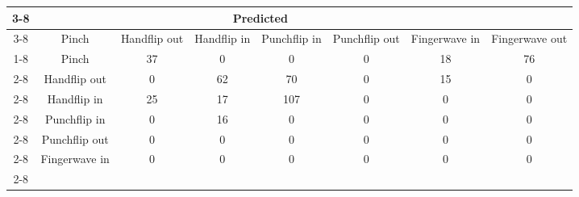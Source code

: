\documentclass{standalone}
\begin{document}
 
 \begin{tabular}{|c |c |c |c |c |c |c |c |}
\cline{3-8}\multicolumn{2}{c|}{} & \multicolumn{6}{c|}{Predicted} \\ 
\cline{3-8} \multicolumn{2}{c |}{ } & Pinch & Handflip out & Handflip in & Punchflip in & Punchflip out & Fingerwave in & Fingerwave out\\ 
\cline{1-8}\multirow{6}{*}{\rotatebox[origin=c]{90}{Actual}} & Pinch & 37 & 0 & 0 & 0 & 18 & 76\\ 
 \cline{2-8} & Handflip out & 0 & 62 & 70 & 0 & 15 & 0\\ 
 \cline{2-8} & Handflip in & 25 & 17 & 107 & 0 & 0 & 0\\ 
 \cline{2-8} & Punchflip in & 0 & 16 & 0 & 0 & 0 & 0\\ 
 \cline{2-8} & Punchflip out & 0 & 0 & 0 & 0 & 0 & 0\\ 
 \cline{2-8} & Fingerwave in & 0 & 0 & 0 & 0 & 0 & 0\\ 
 \cline{2-8}\hline \end{tabular}
 
\end{document}
